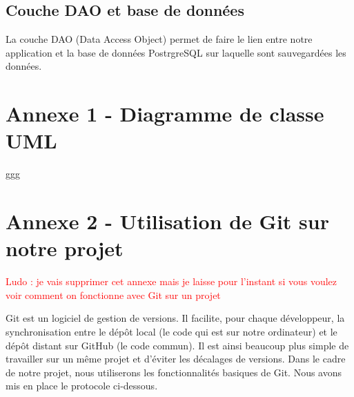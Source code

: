 \documentclass[11pt]{article}
\begin{document}
\subsection{Couche DAO et base de données}

La couche DAO (Data Access Object) permet de faire le lien entre notre application et la base de données PostrgreSQL sur laquelle sont sauvegardées les données.





\newpage










\newpage
{}
\appendix  %
\section*{Annexe 1 - Diagramme de classe UML}


ggg



\newpage

\section*{Annexe 2 - Utilisation de Git sur notre projet}

\textcolor{red}{Ludo : je vais supprimer cet annexe mais je laisse pour l'instant si vous voulez voir comment on fonctionne avec Git sur un projet}


Git est un logiciel de gestion de versions. Il facilite, pour chaque développeur, la synchronisation entre le dépôt local (le code qui est sur notre ordinateur) et le dépôt distant sur GitHub (le code commun). Il est ainsi beaucoup plus simple de travailler sur un même projet et d'éviter les décalages de versions. Dans le cadre de notre projet, nous utiliserons les fonctionnalités basiques de Git. Nous avons mis en place le protocole ci-dessous.
\end{document}
